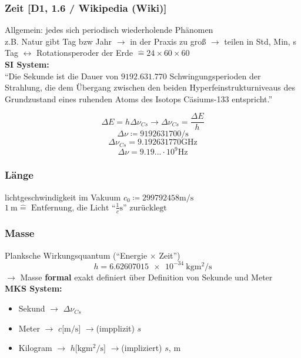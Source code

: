 \documentclass{gadsescript}
\begin{document}
\subsubsection{Zeit [D1, 1.6 / Wikipedia (Wiki)]}
Allgemein: jedes sich periodisch wiederholende Phänomen\\
z.B. Natur gibt Tag bzw Jahr $\rightarrow$ in der Praxis zu groß $\rightarrow$ teilen in Std, Min, s\\
\indent{} Tag $\leftrightarrow$ Rotationsperoder der Erde $\hat= 24 \times 60 \times 60$\\

\textbf{SI System:}\\
``Die Sekunde ist die Dauer von $9192.631.770$ Schwingungsperioden der Strahlung, die dem Übergang zwischen den beiden Hyperfeinstrukturniveaus des Grundzustand eines ruhenden Atoms des Isotops Cäsiums-133 entspricht.''\\

\[ \Delta E = h \Delta \nu_{Cs} \rightarrow \Delta\nu_{Cs} = \frac{\Delta E}{h} \]
\[ \Delta\nu \coloneqq 9192631700 \unit{\per\second} \]
\[ \Delta\nu_{Cs} = 9.192631770 \unit{\giga\hertz} \]
\[ \Delta\nu = 9.19... \cdot 10^{9}\unit{\hertz} \]

\subsubsection{Länge}
lichtgeschwindigkeit im Vakuum $ c_0 \coloneqq 299792458 \unit{\metre\per\second} $\\
$\qty{1}{\metre} \hat= \text{ Entfernung, die Licht ``$\frac{1}{c} \unit{\second}$'' zurücklegt} $\\

\subsubsection{Masse}
Planksche Wirkungsquantum (``Energie $\times$ Zeit'')
\[ h = \qty{6.62607015e-34}{\kilogram\square\meter\per\second} \]
$\rightarrow$ Masse \textbf{formal} exakt definiert über Definition von Sekunde und Meter\\

\textbf{MKS System:}
\begin{itemize}
	\item Sekund $\rightarrow$ $\Delta\nu_{Cs}$
	\item Meter $\rightarrow$ $ c[\unit{\metre\per\second]}$  $\rightarrow$(impplizit) $\unit{s}$
	\item Kilogram $\rightarrow$ $h [\unit{\kilogram\square\metre\per\second]}$ $\rightarrow$(impliziert) $\unit{s}$, $\unit{\metre}$
\end{itemize}
\end{document}
